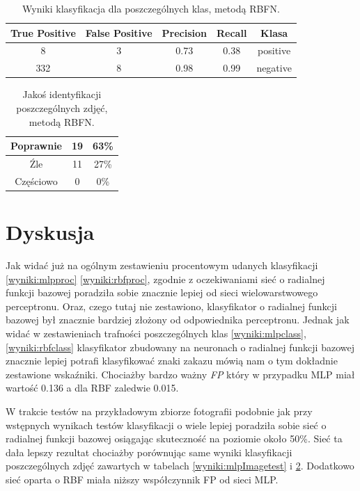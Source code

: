 \documentclass{classrep}
\begin{document}
\begin{table}[H]
\centering
\begin{tabular}{|c|c|c|c|c|}
\hline 
True Positive &  False Positive &  Precision &  Recall &  Klasa\\
\hline
8    &   3  &    0.73  &   0.38 &    positive\\
\hline
332  &   8   &   0.98  &   0.99  & negative\\
\hline 
\end{tabular} 
\caption{Wyniki klasyfikacja dla poszczególnych klas, metodą RBFN.}
\label{wyniki:rbftestclass}
\end{table}
 
 \begin{table}[H]
\centering
\begin{tabular}{|c|c|c|}
\hline 
Poprawnie &19 & 63\% \\ 
\hline 
Źle & 11 & 27\% \\
\hline 
Częściowo & 0 & 0\% \\ 
\hline 
\end{tabular} 
\caption{Jakoś identyfikacji poszczególnych zdjęć, metodą RBFN.}
\label{wyniki:rbftImagetest}
\end{table}
\section{Dyskusja}

Jak widać już na ogólnym zestawieniu procentowym udanych klasyfikacji \ref{wyniki:mlpproc} \ref{wyniki:rbfproc}, zgodnie z oczekiwaniami sieć o radialnej funkcji bazowej poradziła sobie znacznie lepiej od sieci wielowarstwowego perceptronu. Oraz, czego tutaj nie zestawiono, klasyfikator o radialnej funkcji bazowej był znacznie bardziej złożony od odpowiednika perceptronu. Jednak jak widać w zestawieniach trafności poszczególnych klas \ref{wyniki:mlpclass}, \ref{wyniki:rbfclass} klasyfikator zbudowany na neuronach o radialnej funkcji bazowej znacznie lepiej potrafi klasyfikować znaki zakazu mówią nam o tym dokładnie zestawione wskaźniki. Chociażby bardzo ważny \emph{FP} który w przypadku MLP miał wartość 0.136 a dla RBF zaledwie 0.015.

W trakcie testów na przykładowym zbiorze fotografii podobnie jak przy wstępnych wynikach testów klasyfikacji o wiele lepiej poradziła sobie sieć o radialnej funkcji bazowej osiągając skuteczność na poziomie około 50\%. Sieć ta dała lepszy rezultat chociażby porównując same wyniki klasyfikacji poszczególnych zdjęć zawartych w tabelach \ref{wyniki:mlpImagetest} i \ref{wyniki:rbftImagetest}. Dodatkowo sieć oparta o RBF miała niższy współczynnik FP od sieci MLP.  
\end{document}

